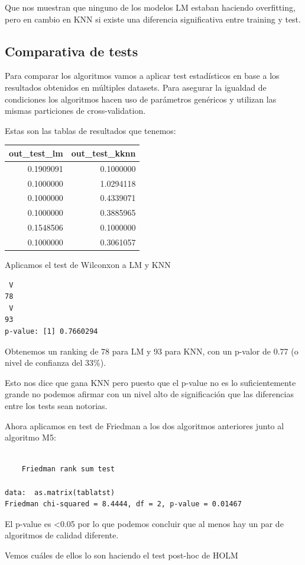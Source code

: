 Que nos muestran que ninguno de los modelos LM estaban haciendo overfitting, pero en cambio en KNN si existe una diferencia significativa entre training y test.

\subsection{Comparativa de tests}

Para comparar los algoritmos vamos a aplicar test estadísticos en base a los resultados obtenidos en múltiples datasets. Para asegurar la igualdad de condiciones los algoritmos hacen uso de parámetros genéricos y utilizan las mismas particiones de cross-validation.

Estas son las tablas de resultados que tenemos:

\begin{longtable}[]{@{}rr@{}}
\toprule
out\_test\_lm & out\_test\_kknn\tabularnewline
\midrule
\endhead
0.1909091 & 0.1000000\tabularnewline
0.1000000 & 1.0294118\tabularnewline
0.1000000 & 0.4339071\tabularnewline
0.1000000 & 0.3885965\tabularnewline
0.1548506 & 0.1000000\tabularnewline
0.1000000 & 0.3061057\tabularnewline
\bottomrule
\end{longtable}

Aplicamos el test de Wilconxon a LM y KNN

\begin{verbatim}
 V 
78 
 V 
93 
p-value: [1] 0.7660294
\end{verbatim}

Obtenemos un ranking de 78 para LM y 93 para KNN, con un p-valor de 0.77 (o nivel de confianza del 33\%).

Esto nos dice que gana KNN pero puesto que el p-value no es lo suficientemente grande no podemos afirmar con un nivel alto de significación que las diferencias entre los tests sean notorias.

Ahora aplicamos en test de Friedman a los dos algoritmos anteriores junto al algoritmo M5:

\begin{verbatim}

    Friedman rank sum test

data:  as.matrix(tablatst)
Friedman chi-squared = 8.4444, df = 2, p-value = 0.01467
\end{verbatim}

El p-value es \textless0.05 por lo que podemos concluir que al menos hay un par de algoritmos de calidad diferente.

Vemos cuáles de ellos lo son haciendo el test post-hoc de HOLM

